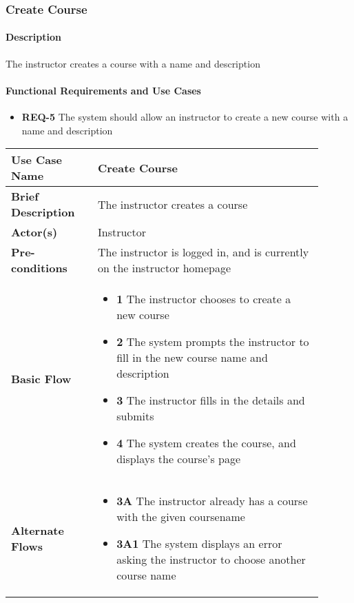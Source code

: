 \documentclass{article}
\begin{document}
\subsubsection{Create Course}

\paragraph{Description} The instructor creates a course with a name and description


\paragraph{Functional Requirements and Use Cases}
\begin{itemize}
  \item \textbf{REQ-5} The system should allow an instructor to create a new course with a name and description
\end{itemize}

\vspace{0.1in}

\begin{tabular}{| p{0.25\linewidth} | p{0.65\linewidth} |}
  \hline
  \textbf{Use Case Name} & Create Course \\
  \hline
  \textbf{Brief Description} & The instructor creates a course \\
  \hline
  \textbf{Actor(s)} & Instructor \\
  \hline
  \textbf{Pre-conditions} & The instructor is logged in, and is currently on the instructor homepage\\
  \hline
  \textbf{Basic Flow} & \begin{itemize}
    \item[] \textbf{1} The instructor chooses to create a new course
    \item[] \textbf{2} The system prompts the instructor to fill in the new course name and description
    \item[] \textbf{3} The instructor fills in the details and submits
    \item[] \textbf{4} The system creates the course, and displays the course's page
  \end{itemize}\\
  \hline
  \textbf{Alternate Flows} & \begin{itemize}
    \item[] \textbf{3A} The instructor already has a course with the given coursename
    \item[] \textbf{3A1} The system displays an error asking the instructor to choose another course name
  \end{itemize} \\
  \hline
\end{tabular}
\end{document}
